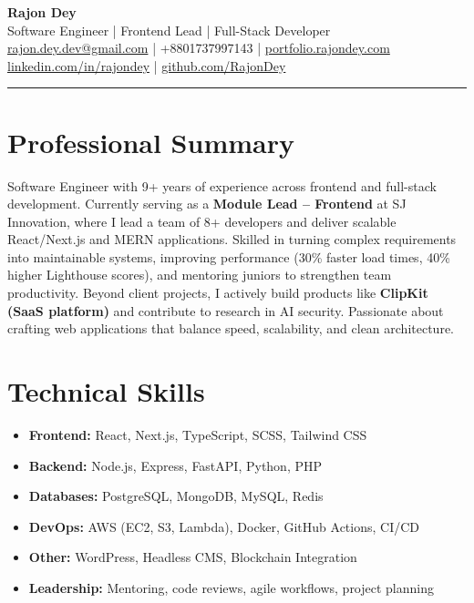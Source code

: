 \documentclass[a4paper,10pt]{article}
\begin{document}
\pagestyle{empty}

\begin{center}
    {\huge\bfseries Rajon Dey} \\
    \vspace{2mm}
    {\large Software Engineer | Frontend Lead | Full-Stack Developer} \\
    \vspace{3mm}
    \href{mailto:rajon.dey.dev@gmail.com}{rajon.dey.dev@gmail.com} \quad|\quad
    +8801737997143 \quad|\quad
    \href{https://portfolio.rajondey.com}{portfolio.rajondey.com} \\
    \href{https://linkedin.com/in/rajondey}{linkedin.com/in/rajondey} \quad|\quad
    \href{https://github.com/RajonDey}{github.com/RajonDey}
\end{center}

\vspace{3mm}
\hrule
\vspace{3mm}

\section*{Professional Summary}
Software Engineer with 9+ years of experience across frontend and full-stack development. Currently serving as a \textbf{Module Lead – Frontend} at SJ Innovation, where I lead a team of 8+ developers and deliver scalable React/Next.js and MERN applications. Skilled in turning complex requirements into maintainable systems, improving performance (30\% faster load times, 40\% higher Lighthouse scores), and mentoring juniors to strengthen team productivity. Beyond client projects, I actively build products like \textbf{ClipKit (SaaS platform)} and contribute to research in AI security. Passionate about crafting web applications that balance speed, scalability, and clean architecture.

\section*{Technical Skills}
\begin{itemize}[leftmargin=*,itemsep=0.5pt]
    \item \textbf{Frontend:} React, Next.js, TypeScript, SCSS, Tailwind CSS
    \item \textbf{Backend:} Node.js, Express, FastAPI, Python, PHP
    \item \textbf{Databases:} PostgreSQL, MongoDB, MySQL, Redis
    \item \textbf{DevOps:} AWS (EC2, S3, Lambda), Docker, GitHub Actions, CI/CD
    \item \textbf{Other:} WordPress, Headless CMS, Blockchain Integration
    \item \textbf{Leadership:} Mentoring, code reviews, agile workflows, project planning
\end{itemize}
\end{document}
